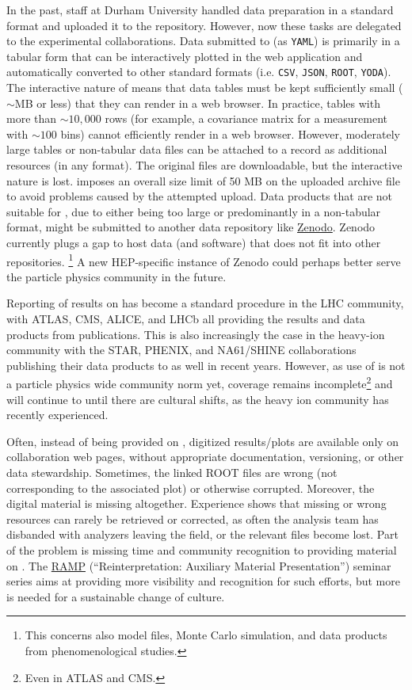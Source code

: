 \documentclass[11pt]{article}
\begin{document}
In the past, \hepdata staff at Durham University handled data preparation in a standard format and uploaded it to the repository.
However, now these tasks are delegated to the experimental collaborations.
Data submitted to \hepdata (as \texttt{YAML}) is primarily in a tabular form that can be interactively plotted in the web application and automatically converted to other standard formats (i.e. \texttt{CSV}, \texttt{JSON}, \texttt{ROOT}, \texttt{YODA}).
The interactive nature of \hepdata means that data tables must be kept sufficiently small ($\sim$MB or less) that they can render in a web browser.
In practice, tables with more than $\sim 10,000$ rows (for example, a covariance matrix for a measurement with $\sim 100$ bins) cannot efficiently render in a web browser.
However, moderately large tables or non-tabular data files can be attached to a \hepdata record as additional resources (in any format).
The original files are downloadable, but the interactive nature is lost.
\hepdata imposes an overall size limit of 50 MB on the uploaded archive file to avoid problems caused by the attempted upload. 
%
Data products that are not suitable for \hepdata, due to either being too large or predominantly in a non-tabular format, might be submitted to another data repository like \href{https://zenodo.org/}{Zenodo}.
Zenodo currently plugs a gap to host data (and software) that does not fit into other repositories.%
\footnote{This concerns also model files, Monte Carlo simulation, and data products from phenomenological studies.}
A new \gls{HEP}-specific instance of Zenodo could perhaps better serve the particle physics community in the future.


Reporting of results on \hepdata has become a standard procedure in the \gls{LHC} community, with \gls{ATLAS}, \gls{CMS}, \gls{ALICE}, and \gls{LHCb} all providing the results and data products from publications.
This is also increasingly the case in the heavy-ion community with the \gls{STAR}, \gls{PHENIX}, and NA61/SHINE collaborations publishing their data products to \hepdata as well in recent years.
However, as use of \hepdata is not a particle physics wide community norm yet, coverage remains incomplete\footnote{Even in \gls{ATLAS} and \gls{CMS}.} and will continue to until there are cultural shifts, as the heavy ion community has recently experienced.

Often, instead of being provided on \hepdata, digitized results/plots are available only on collaboration web pages, without appropriate documentation, versioning, or other data stewardship.
Sometimes, the linked ROOT files are wrong (not corresponding to the associated plot) or otherwise corrupted.
Moreover, the digital material is missing altogether.
Experience shows that missing or wrong resources can rarely be retrieved or corrected, as often the analysis team has disbanded with analyzers leaving the field, or the relevant files become lost. 
Part of the problem is missing time and community recognition to providing material on \hepdata.
The \href{https://indico.cern.ch/category/14155/}{RAMP} (``Reinterpretation: Auxiliary Material Presentation'') seminar series aims at providing more visibility and recognition for such efforts,  but more is needed for a 
sustainable change of culture. 
\end{document}
